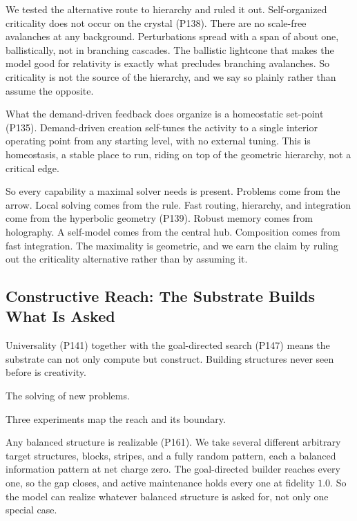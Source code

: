 We tested the alternative route to hierarchy and ruled it out. Self-organized criticality does not occur on the crystal (P138). There are no scale-free avalanches at any background. Perturbations spread with a span of about one, ballistically, not in branching cascades. The ballistic lightcone that makes the model good for relativity is exactly what precludes branching avalanches. So criticality is not the source of the hierarchy, and we say so plainly rather than assume the opposite.

What the demand-driven feedback does organize is a homeostatic set-point (P135). Demand-driven creation self-tunes the activity to a single interior operating point from any starting level, with no external tuning. This is homeostasis, a stable place to run, riding on top of the geometric hierarchy, not a critical edge.

So every capability a maximal solver needs is present. Problems come from the arrow. Local solving comes from the rule. Fast routing, hierarchy, and integration come from the hyperbolic geometry (P139). Robust memory comes from holography. A self-model comes from the central hub. Composition comes from fast integration. The maximality is geometric, and we earn the claim by ruling out the criticality alternative rather than by assuming it.

\subsection{Constructive Reach: The Substrate Builds What Is Asked}

Universality (P141) together with the goal-directed search (P147) means the substrate can not only compute but construct. Building structures never seen before is creativity.

\begin{definition}[Creativity]
The solving of new problems.
\end{definition}

Three experiments map the reach and its boundary.

Any balanced structure is realizable (P161). We take several different arbitrary target structures, blocks, stripes, and a fully random pattern, each a balanced information pattern at net charge zero. The goal-directed builder reaches every one, so the gap closes, and active maintenance holds every one at fidelity $1.0$. So the model can realize whatever balanced structure is asked for, not only one special case.

